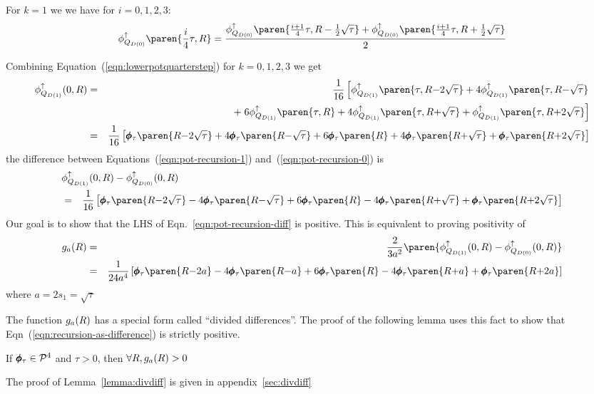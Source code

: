 \documentclass{article}[12pt]
\begin{document}
For $k=1$ we we have for $i=0,1,2,3$:
\begin{equation}   \label{eqn:lowerpotquarterstep}
   \lowerpotMdkpar{0}\paren{\frac{i}{4}\tau,\R}=
 \frac{\lowerpotMdkpar{0}\paren{\frac{i+1}{4}\tau,\R-\frac{1}{2}\sqrt{\tau}}+
   \lowerpotMdkpar{0}\paren{\frac{i+1}{4}\tau,\R+\frac{1}{2}\sqrt{\tau}}}{2}
 \end{equation}

\newcommand{\iter}[1]{\lowerpotMdkpar{1}\paren{\tau,\R {#1} \sqrt{\tau}}}
\newcommand{\iterzero}{\lowerpotMdkpar{1}\paren{\tau,\R}}

\newcommand{\fIter}[1]{\finalPotTau \paren{R {#1} \sqrt{\tau}}}
\newcommand{\fIterzero}{\finalPotTau \paren{R}}

\newcommand{\gIter}[1]{\finalPotTau \paren{R {#1} a}}
\newcommand{\gIterzero}{\finalPotTau \paren{R}}

Combining Equation~(\ref{eqn:lowerpotquarterstep}) for $k=0,1,2,3$ we get
\small
\begin{eqnarray} \label{eqn:pot-recursion-1}
  \lowerpotMdkpar{1}(0, \R)
  &=& \frac{1}{16}
      \left[\iter{-2}+4\iter{-} \right. \\
  &&+ \left. 6\iterzero +4\iter{+}+\iter{+2}\right] \nonumber\\
  &=& \frac{1}{16}
      \left[\fIter{-2}+4\fIter{-}+6\fIterzero +4\fIter{+}+\fIter{+2}\right] \nonumber
\end{eqnarray}
\normalsize the difference between
Equations~(\ref{eqn:pot-recursion-1}) and~(\ref{eqn:pot-recursion-0})
is \small
\begin{eqnarray} \label{eqn:pot-recursion-diff}
  \lefteqn{\lowerpotMdkpar{1}(0, \R) - \lowerpotMdkpar{0}(0, \R)}\\
&=&  \frac{1}{16}
\left[\fIter{-2}-4\fIter{-}+6\fIterzero -4\fIter{+}+\fIter{+2}\right] \nonumber
\end{eqnarray}
\normalsize Our goal is to show that the LHS of
Eqn.~\ref{eqn:pot-recursion-diff} is positive. This is equivalent to
proving positivity of
\begin{eqnarray}
g_a(\R) &=& \frac{2}{3a^2}\paren{\lowerpotMdkpar{1}(0, \R) -
  \lowerpotMdkpar{0}(0, \R)}\nonumber \\
& = &
\frac{1}{24 a^4}
      \left[\gIter{-2}-4\gIter{-}+6\gIterzero -4\gIter{+}+\gIter{+2}\right]
       \label{eqn:recursion-as-difference}
\end{eqnarray}
where $a=2 s_1=\sqrt{\tau}$

The function $g_a(R)$ has a special form called ``divided
differences''. The proof of the following lemma uses this fact to show that 
Eqn~(\ref{eqn:recursion-as-difference}) is strictly positive.
\begin{lemma} \label{lemma:divdiff}
If $\pmb{\phi}_{\tau} \in {\cal P}^{4}$ and $\tau>0$, then $\forall R, g_a(R)>0$
\end{lemma}
The proof of Lemma~\ref{lemma:divdiff} is given in appendix~\ref{sec:divdiff}
\end{document}
